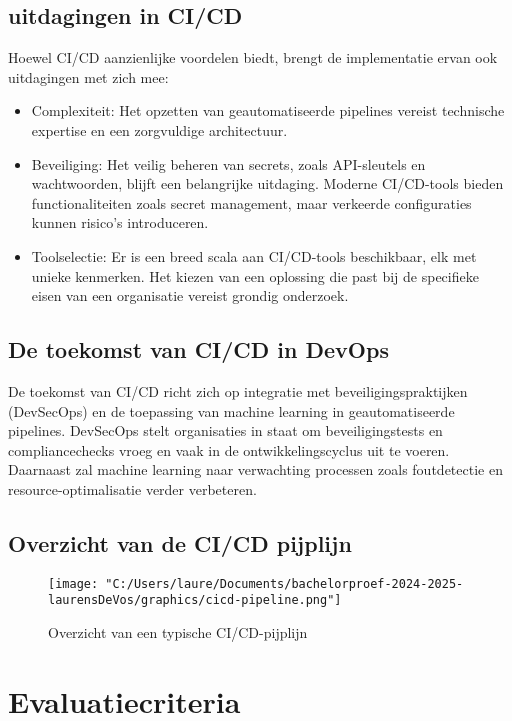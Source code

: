 \subsection{uitdagingen in CI/CD}
Hoewel CI/CD aanzienlijke voordelen biedt, brengt de implementatie ervan ook uitdagingen met zich mee:
\begin{itemize}
    \item Complexiteit: Het opzetten van geautomatiseerde pipelines vereist technische expertise en een zorgvuldige architectuur. \autocite{Learn2024}
    \item Beveiliging: Het veilig beheren van secrets, zoals API-sleutels en wachtwoorden, blijft een belangrijke uitdaging. Moderne CI/CD-tools bieden functionaliteiten zoals secret management, maar verkeerde configuraties kunnen risico's introduceren. \autocite{atlassian2024}
    \item Toolselectie: Er is een breed scala aan CI/CD-tools beschikbaar, elk met unieke kenmerken. Het kiezen van een oplossing die past bij de specifieke eisen van een organisatie vereist grondig onderzoek. \autocite{true_cicd2024}
\end{itemize}


\subsection{De toekomst van CI/CD in DevOps}
De toekomst van CI/CD richt zich op integratie met beveiligingspraktijken (DevSecOps) en de toepassing van machine learning in geautomatiseerde pipelines. DevSecOps stelt organisaties in staat om beveiligingstests en compliancechecks vroeg en vaak in de ontwikkelingscyclus uit te voeren. Daarnaast zal machine learning naar verwachting processen zoals foutdetectie en resource-optimalisatie verder verbeteren. \autocite{marques2023}

\subsection{Overzicht van de CI/CD pijplijn}

\begin{figure}[h!]
    \centering
    \texttt{[image: "C:/Users/laure/Documents/bachelorproef-2024-2025-laurensDeVos/graphics/cicd-pipeline.png"]}
    \caption{Overzicht van een typische CI/CD-pijplijn}
    \label{fig:cicd-pipeline}
    \autocite{GitHub2022}
\end{figure}


\section{Evaluatiecriteria}

